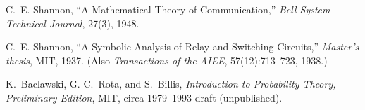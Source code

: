 \documentclass{report}
\begin{document}
\vspace{1em}
\begin{thebibliography}{9}
C.~E. Shannon,
\newblock ``A Mathematical Theory of Communication,''
\newblock \emph{Bell System Technical Journal}, 27(3), 1948.

C.~E. Shannon,
\newblock ``A Symbolic Analysis of Relay and Switching Circuits,''
\newblock \emph{Master's thesis}, MIT, 1937. (Also \emph{Transactions of the AIEE}, 57(12):713--723, 1938.)

K.~Baclawski, G.-C.~Rota, and S.~Billis,
\newblock \emph{Introduction to Probability Theory, Preliminary Edition},
\newblock MIT, circa 1979--1993 draft (unpublished).

\end{thebibliography}
\end{document}
